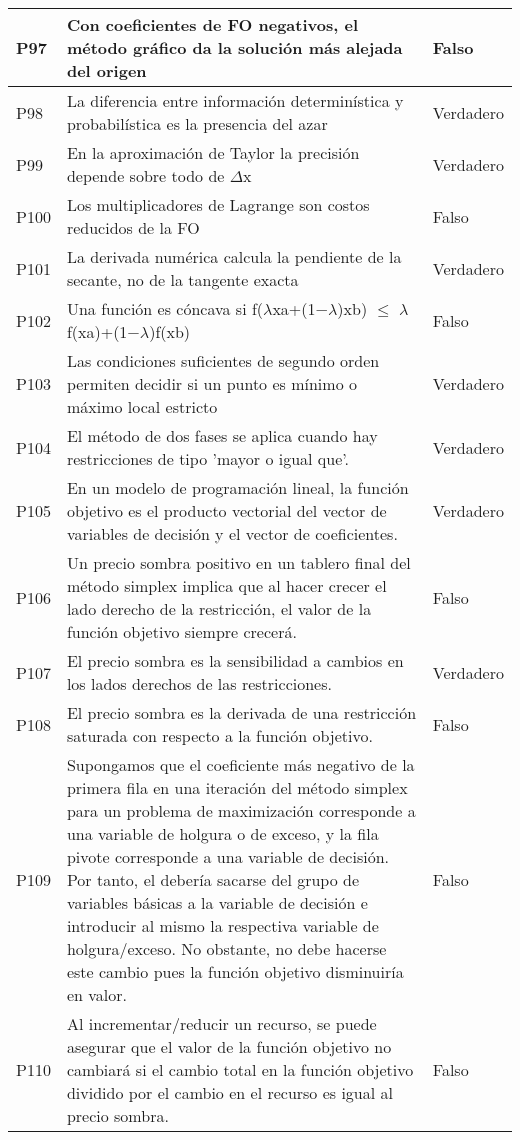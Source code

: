\documentclass{article}
\begin{document}
\begin{longtable}{|p{1.5cm}|p{14cm}|p{2cm}|}
P97 & Con coeficientes de FO negativos, el método gráfico da la solución más alejada del origen & Falso \\ \hline
P98 & La diferencia entre información determinística y probabilística es la presencia del azar & Verdadero \\ \hline
P99 & En la aproximación de Taylor la precisión depende sobre todo de $\Delta$x & Verdadero \\ \hline
P100 & Los multiplicadores de Lagrange son costos reducidos de la FO & Falso \\ \hline
P101 & La derivada numérica calcula la pendiente de la secante, no de la tangente exacta & Verdadero \\ \hline
P102 & Una función es cóncava si f($\lambda$xa+(1−$\lambda$)xb) $\leq$ $\lambda$f(xa)+(1−$\lambda$)f(xb) & Falso \\ \hline
P103 & Las condiciones suficientes de segundo orden permiten decidir si un punto es mínimo o máximo local estricto & Verdadero \\ \hline
P104 & El método de dos fases se aplica cuando hay restricciones de tipo 'mayor o igual que'. & Verdadero \\ \hline
P105 & En un modelo de programación lineal, la función objetivo es el producto vectorial del vector de variables de decisión y el vector de coeficientes. & Verdadero \\ \hline
P106 & Un precio sombra positivo en un tablero final del método simplex implica que al hacer crecer el lado derecho de la restricción, el valor de la función objetivo siempre crecerá. & Falso \\ \hline
P107 & El precio sombra es la sensibilidad a cambios en los lados derechos de las restricciones. & Verdadero \\ \hline
P108 & El precio sombra es la derivada de una restricción saturada con respecto a la función objetivo. & Falso \\ \hline
P109 & Supongamos que el coeficiente más negativo de la primera fila en una iteración del método simplex para un problema de maximización corresponde a una variable de holgura o de exceso, y la fila pivote corresponde a una variable de decisión. Por tanto, el debería sacarse del grupo de variables básicas a la variable de decisión e introducir al mismo la respectiva variable de holgura/exceso. No obstante, no debe hacerse este cambio pues la función objetivo disminuiría en valor. & Falso \\ \hline
P110 & Al incrementar/reducir un recurso, se puede asegurar que el valor de la función objetivo no cambiará si el cambio total en la función objetivo dividido por el cambio en el recurso es igual al precio sombra. & Falso \\ \hline

\end{longtable}
\end{document}
